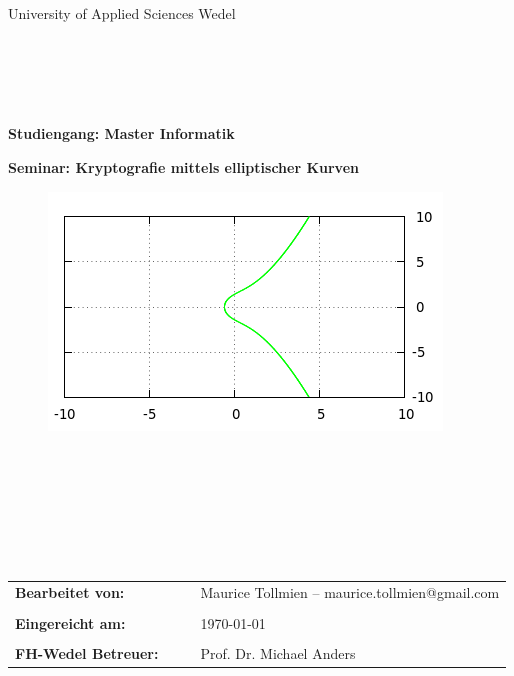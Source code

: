 
\begin{center}
\Large{University of Applied Sciences Wedel}
\end{center}

\begin{verbatim}



\end{verbatim}

\begin{verbatim}


\end{verbatim}

\begin{center}
\textbf{\large{Studiengang: Master Informatik}}
\end{center}


\begin{center}
\textbf{\large{Seminar: Kryptografie mittels elliptischer Kurven}}
\end{center}

\begin{figure}[h]
	\begin{center}
		\includegraphics[keepaspectratio=true, scale=0.8]{./pictures/curve_simple.png}
	\end{center}
\end{figure}

\begin{verbatim}







\end{verbatim}

\begin{flushleft}
\begin{tabular}{llll}

\textbf{Bearbeitet von:}
& & & Maurice Tollmien -- maurice.tollmien@gmail.com
\\& & &
\\
\textbf{Eingereicht am:}
& & & \today
\\& & &
\\
\textbf{FH-Wedel Betreuer:}
& & & Prof. Dr. Michael Anders




\end{tabular}
\end{flushleft}

\thispagestyle{empty}

\newpage

\thispagestyle{empty}
